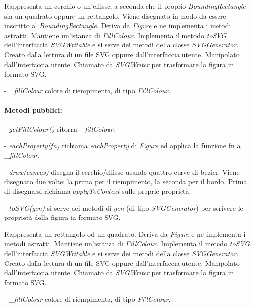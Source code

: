 Rappresenta un cerchio o un'ellisse, a seconda che il proprio \textit{BoundingRectangle} sia un quadrato oppure un rettangolo. Viene disegnato in modo da essere inscritto al \textit{BoundingRectangle}.
Deriva da \textit{Figure} e ne implementa i metodi astratti. Mantiene un'istanza di \textit{FillColour}. Implementa il metodo \textit{toSVG} dell'interfaccia \textit{SVGWritable} e si serve dei metodi della classe \textit{SVGGenerator}.
Creato dalla lettura di un file SVG oppure dall'interfaccia utente. Manipolato dall'interfaccia utente. Chiamato da \textit{SVGWriter} per trasformare la figura in formato SVG.
\begin{elencopuntato}[\normindent]
\item[-] \textit{{\_}fillColour} colore di riempimento, di tipo \textit{FillColour}.
\end{elencopuntato}
\paragraph{Metodi pubblici:}
\begin{elencopuntato}[\normindent]
\item[-] \textit{getFillColour()} ritorna \textit{{\_}fillColour}.
\item[-] \textit{eachProperty(fn)} richiama \textit{eachProperty} di \textit{Figure} ed applica la funzione fn a \textit{{\_}fillColour}.
\item[-] \textit{draw(canvas)} disegna il cerchio/ellisse usando quattro curve di bezier. Viene disegnato due volte: la prima per il riempimento, la seconda per il bordo. Prima di disegnarsi richiama \textit{applyToContext} sulle proprie propriet\`a.
\item[-] \textit{toSVG(gen)} si serve dei metodi di \textit{gen} (di tipo \textit{SVGGenerator}) per scrivere le propriet\`a della figura in formato SVG.
\end{elencopuntato}

Rappresenta un rettangolo od un quadrato.
Deriva da \textit{Figure} e ne implementa i metodi astratti. Mantiene un'istanza di \textit{FillColour}. Implementa il metodo \textit{toSVG} dell'interfaccia \textit{SVGWritable} e si serve dei metodi della classe \textit{SVGGenerator}.
Creato dalla lettura di un file SVG oppure dall'interfaccia utente. Manipolato dall'interfaccia utente. Chiamato da \textit{SVGWriter} per trasformare la figura in formato SVG.
\begin{elencopuntato}[\normindent]
\item[-] \textit{{\_}fillColour} colore di riempimento, di tipo \textit{FillColour}.
\end{elencopuntato}
